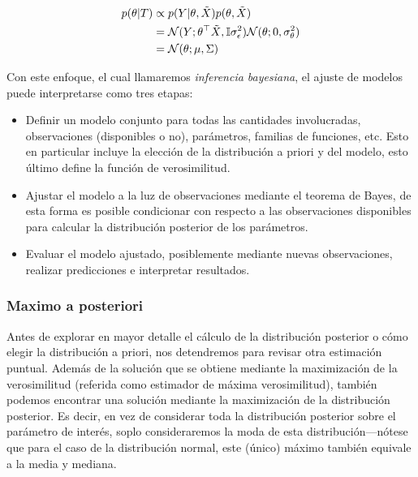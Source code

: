 \begin{align}
	p(\theta|T)	&\propto p(Y|\theta,\tilde{X})p(\theta,\tilde{X})\label{eq:gaussian_post}\\
				&= {\mathcal N}(Y;\theta^\top\tilde{X},{\mathbb I}\sigma_\epsilon^2){\mathcal N}(\theta;0,\sigma_\theta^2)\nonumber\\
				&={\mathcal N}(\theta; \mu,\Sigma)\nonumber
\end{align}





Con este enfoque, el cual llamaremos \emph{inferencia bayesiana}, el ajuste de modelos puede interpretarse como tres etapas:

\begin{itemize}
	\item Definir un modelo conjunto para todas las cantidades involucradas, observaciones (disponibles o no), parámetros, familias de funciones, etc. Esto en particular incluye la elección de la distribución a priori y del modelo, esto último define la función de verosimilitud.
	\item Ajustar el modelo a la luz de observaciones mediante el teorema de Bayes, de esta forma es posible condicionar con respecto a las observaciones disponibles para calcular la distribución posterior de los parámetros.  
	\item Evaluar el modelo ajustado, posiblemente mediante nuevas observaciones, realizar predicciones e  interpretar resultados.
\end{itemize}



\subsubsection{Maximo a posteriori} %
\label{sub:map}

Antes de explorar en mayor detalle el cálculo de la distribución posterior o cómo elegir la distribución a priori, nos detendremos para revisar otra estimación puntual. Además de la solución que se obtiene mediante la maximización de la verosimilitud (referida como estimador de máxima verosimilitud), también podemos encontrar una solución mediante la maximización de la distribución posterior. Es decir, en vez de considerar toda la distribución posterior sobre el parámetro de interés, soplo consideraremos la moda de esta distribución---nótese que para el caso de la distribución normal, este (único) máximo también equivale a la media y mediana.

